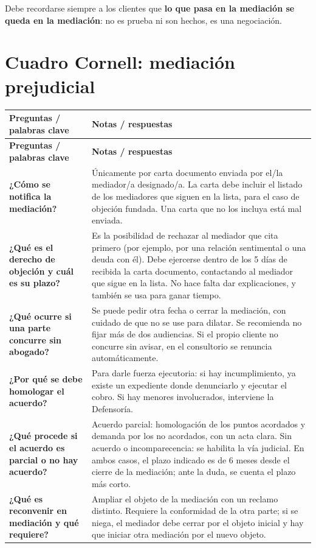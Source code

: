 \documentclass[12pt,oneside]{book}
\makeatletter
\newenvironment{cornell}{%
  \par\smallskip
  \begin{longtable}{@{}>{\raggedright\arraybackslash}p{0.28\textwidth}
                    >{\raggedright\arraybackslash}p{0.66\textwidth}@{}}
  \toprule
  \textbf{Preguntas / palabras clave} & \textbf{Notas / respuestas} \\
  \midrule
  \endfirsthead
  \toprule
  \textbf{Preguntas / palabras clave} & \textbf{Notas / respuestas} \\
  \midrule
  \endhead
}{%
  \bottomrule
  \end{longtable}
}
\makeatother
\begin{document}
Debe recordarse siempre a los clientes que \textbf{lo que pasa en la mediación se queda en la mediación}: no es prueba ni son hechos, es una negociación.

\section{Cuadro Cornell: mediación prejudicial}

\begin{cornell}
\textbf{¿Cómo se notifica la mediación?} &
Únicamente por carta documento enviada por el/la mediador/a designado/a. La carta debe incluir el listado de los mediadores que siguen en la lista, para el caso de objeción fundada. Una carta que no los incluya está mal enviada. \\[0.6em]

\textbf{¿Qué es el derecho de objeción y cuál es su plazo?} &
Es la posibilidad de rechazar al mediador que cita primero (por ejemplo, por una relación sentimental o una deuda con él). Debe ejercerse dentro de los 5 días de recibida la carta documento, contactando al mediador que sigue en la lista. No hace falta dar explicaciones, y también se usa para ganar tiempo. \\[0.6em]

\textbf{¿Qué ocurre si una parte concurre sin abogado?} &
Se puede pedir otra fecha o cerrar la mediación, con cuidado de que no se use para dilatar. Se recomienda no fijar más de dos audiencias. Si el propio cliente no concurre sin avisar, en el consultorio se renuncia automáticamente. \\[0.6em]

\textbf{¿Por qué se debe homologar el acuerdo?} &
Para darle fuerza ejecutoria: si hay incumplimiento, ya existe un expediente donde denunciarlo y ejecutar el cobro. Si hay menores involucrados, interviene la Defensoría. \\[0.6em]

\textbf{¿Qué procede si el acuerdo es parcial o no hay acuerdo?} &
Acuerdo parcial: homologación de los puntos acordados y demanda por los no acordados, con un acta clara. Sin acuerdo o incomparecencia: se habilita la vía judicial. En ambos casos, el plazo indicado es de 6 meses desde el cierre de la mediación; ante la duda, se cuenta el plazo más corto. \\[0.6em]

\textbf{¿Qué es reconvenir en mediación y qué requiere?} &
Ampliar el objeto de la mediación con un reclamo distinto. Requiere la conformidad de la otra parte; si se niega, el mediador debe cerrar por el objeto inicial y hay que iniciar otra mediación por el nuevo objeto. \\[0.6em]


\end{cornell}
\end{document}
